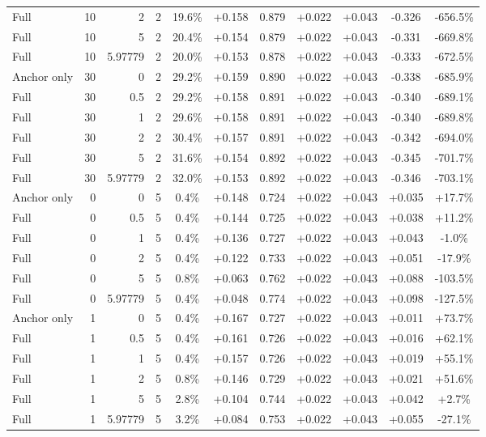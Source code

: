 \begin{table}[htbp]
\begin{tabular}{lrrrccccccc}
Full & 10 & 2 & 2 & 19.6\% & +0.158 & 0.879 & +0.022 & +0.043 & -0.326 & -656.5\% \\
Full & 10 & 5 & 2 & 20.4\% & +0.154 & 0.879 & +0.022 & +0.043 & -0.331 & -669.8\% \\
Full & 10 & 5.97779 & 2 & 20.0\% & +0.153 & 0.878 & +0.022 & +0.043 & -0.333 & -672.5\% \\
Anchor only & 30 & 0 & 2 & 29.2\% & +0.159 & 0.890 & +0.022 & +0.043 & -0.338 & -685.9\% \\
Full & 30 & 0.5 & 2 & 29.2\% & +0.158 & 0.891 & +0.022 & +0.043 & -0.340 & -689.1\% \\
Full & 30 & 1 & 2 & 29.6\% & +0.158 & 0.891 & +0.022 & +0.043 & -0.340 & -689.8\% \\
Full & 30 & 2 & 2 & 30.4\% & +0.157 & 0.891 & +0.022 & +0.043 & -0.342 & -694.0\% \\
Full & 30 & 5 & 2 & 31.6\% & +0.154 & 0.892 & +0.022 & +0.043 & -0.345 & -701.7\% \\
Full & 30 & 5.97779 & 2 & 32.0\% & +0.153 & 0.892 & +0.022 & +0.043 & -0.346 & -703.1\% \\
Anchor only & 0 & 0 & 5 & 0.4\% & +0.148 & 0.724 & +0.022 & +0.043 & +0.035 & +17.7\% \\
Full & 0 & 0.5 & 5 & 0.4\% & +0.144 & 0.725 & +0.022 & +0.043 & +0.038 & +11.2\% \\
Full & 0 & 1 & 5 & 0.4\% & +0.136 & 0.727 & +0.022 & +0.043 & +0.043 & -1.0\% \\
Full & 0 & 2 & 5 & 0.4\% & +0.122 & 0.733 & +0.022 & +0.043 & +0.051 & -17.9\% \\
Full & 0 & 5 & 5 & 0.8\% & +0.063 & 0.762 & +0.022 & +0.043 & +0.088 & -103.5\% \\
Full & 0 & 5.97779 & 5 & 0.4\% & +0.048 & 0.774 & +0.022 & +0.043 & +0.098 & -127.5\% \\
Anchor only & 1 & 0 & 5 & 0.4\% & +0.167 & 0.727 & +0.022 & +0.043 & +0.011 & +73.7\% \\
Full & 1 & 0.5 & 5 & 0.4\% & +0.161 & 0.726 & +0.022 & +0.043 & +0.016 & +62.1\% \\
Full & 1 & 1 & 5 & 0.4\% & +0.157 & 0.726 & +0.022 & +0.043 & +0.019 & +55.1\% \\
Full & 1 & 2 & 5 & 0.8\% & +0.146 & 0.729 & +0.022 & +0.043 & +0.021 & +51.6\% \\
Full & 1 & 5 & 5 & 2.8\% & +0.104 & 0.744 & +0.022 & +0.043 & +0.042 & +2.7\% \\
Full & 1 & 5.97779 & 5 & 3.2\% & +0.084 & 0.753 & +0.022 & +0.043 & +0.055 & -27.1\% \\

\end{tabular}
\end{table}
